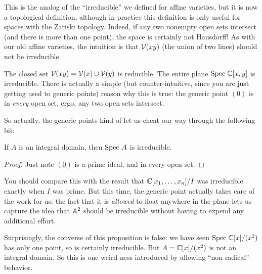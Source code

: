 This is the analog of the ``irreducible''
we defined for affine varieties,
but it is now a topological definition,
although in practice this definition is only
useful for spaces with the Zariski topology.
Indeed, if any two nonempty open sets intersect
(and there is more than one point),
the space is certainly not Hausdorff!
As with our old affine varieties,
the intuition is that $\mathcal V(xy)$ (the union of two lines)
should not be irreducible.

\begin{example}
	\listhack
	\begin{enumerate}[(a)]
		\ii The closed set $\mathcal V(xy) = \mathcal V(x) \cup \mathcal V(y)$ is reducible.
		\ii The entire plane $\text{Spec } \mathbb C[x,y]$ is irreducible.
		There is actually a simple (but counter-intuitive,
		since you are just getting used to generic points)
		reason why this is true:
		the generic point $(0)$ is in \emph{every} open set,
		ergo, any two open sets intersect.
	\end{enumerate}
\end{example}

So actually, the generic points
kind of let us cheat our way through the following bit:
\begin{proposition}
	If $A$ is an integral domain,
	then $\text{Spec } A$ is irreducible.
\end{proposition}
\begin{proof}
	Just note $(0)$ is a prime ideal,
	and in every open set.
\end{proof}
You should compare this with the result that $\mathbb C[x_1, \dots, x_n]/I$
was irreducible exactly when $I$ was prime.
But this time, the generic point actually takes care
of the work for us:
the fact that it is \emph{allowed} to float
anywhere in the plane lets us capture the idea that
$\mathbb A^2$ should be irreducible
without having to expend any additional effort.
\begin{remark}
	Surprisingly, the converse of this proposition is false:
	we have seen $\text{Spec } \mathbb C[x]/(x^2)$ has only one point,
	so is certainly irreducible.
	But $A = \mathbb C[x]/(x^2)$ is not an integral domain.
	So this is one weird-ness introduced by allowing ``non-radical'' behavior.
\end{remark}

